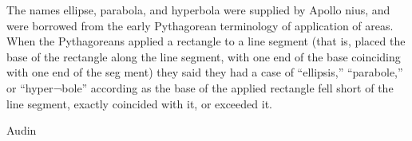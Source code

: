 The names ellipse, parabola, and hyperbola were supplied by Apollo
nius, and were borrowed from the early Pythagorean terminology of
application of areas. When the Pythagoreans applied a rectangle to a
line segment (that is, placed the base of the rectangle along the line
segment, with one end of the base coinciding with one end of the seg
ment) they said they had a case of “ellipsis,” “parabole,” or “hyper¬bole” according as the base of the applied rectangle fell short of the
line segment, exactly coincided with it, or exceeded it.




Audin \cite[s. 183]{audin_2003} %

